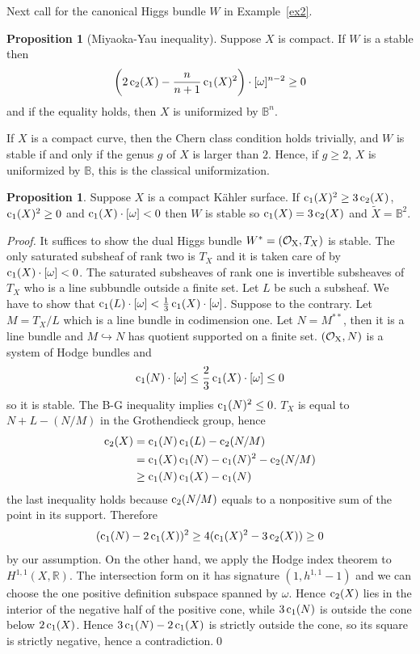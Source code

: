 \documentclass[aspectratio=169, 10pt]{beamer}
\theoremstyle{definition}
\theoremstyle{example}
\newtheorem{proposition}[theorem]{Proposition}
\begin{document}
	\begin{frame}
		Next call for the canonical Higgs bundle $W$ in Example~\ref{ex2}.
		\begin{proposition}[Miyaoka-Yau inequality]\label{prop9.8}
			Suppose $X$ is compact. If $W$ is a stable then \[
			\left(2\operatorname{c}_2(X)-\frac{n}{n+1}\operatorname{c}_1(X)^2\right)\cdot [\omega]^{n-2}\geq 0
			\]
			and if the equality holds, then $X$ is uniformized by $\mathbb{B}^n$.
		\end{proposition}
		If $X$ is a compact curve, then the Chern class condition holds trivially, and $W$ is stable if and only if the genus $g$ of $X$ is larger than $2$. Hence, if $g\geq 2$, $X$ is uniformized by $\mathbb{B}$, this is the classical uniformization.
	\end{frame}
	\begin{frame}[allowframebreaks]
		\begin{proposition}\label{prop9.9}
			Suppose $X$ is a compact K\"ahler surface. If $\operatorname{c}_1(X)^2\geq 3\operatorname{c}_2(X)$, $\operatorname{c}_1(X)^2\geq 0$ and $\operatorname{c}_1(X)\cdot [\omega]<0$ then $W$ is stable so $\operatorname{c}_1(X)=3\operatorname{c}_2(X)$ and $\widetilde{X}=\mathbb{B}^2$.
		\end{proposition}
		\textit{Proof.}
		It suffices to show the dual Higgs bundle $W^*=(\operatorname{\mathcal{O}_X},T_X)$ is stable. The only saturated subsheaf of rank two is $T_X$ and it is taken care of by $\operatorname{c}_1(X)
		\cdot [\omega]<0$. The saturated subsheaves of rank one is invertible subsheaves of $T_X$ who is a line subbundle outside a finite set. Let $L$ be such a subsheaf. We have to show that $\operatorname{c}_1(L)\cdot [\omega]<\frac{1}{3}\operatorname{c}_1(X)\cdot [\omega]$. Suppose to the contrary. Let $M=T_X/L$ which is a line bundle in codimension one. Let $N=M^{**}$, then it is a line bundle and $M\hookrightarrow N$ has quotient supported on a finite set. $(\operatorname{\mathcal{O}_X},N)$ is a system of Hodge bundles and 
		\[
		\operatorname{c}_1(N)\cdot [\omega]\leq \frac{2}{3}\operatorname{c}_1(X)\cdot [\omega]\leq 0
		\]
		so it is stable. The B-G inequality implies $\operatorname{c}_1(N)^2\leq 0$. $T_X$ is equal to $N+L-(N/M)$ in the Grothendieck group, hence 
		\begin{align*}
			\operatorname{c}_2(X)&=\operatorname{c}_1(N)\operatorname{c}_1(L)-\operatorname{c}_2(N/M)\\
			&=\operatorname{c}_1(X)\operatorname{c}_1(N)-\operatorname{c}_1(N)^2-\operatorname{c}_2(N/M)\\
			&\geq \operatorname{c}_1(N)\operatorname{c}_1(X)-\operatorname{c}_1(N)
		\end{align*}
		the last inequality holds because $\operatorname{c}_2(N/M)$ equals to a nonpositive sum of the point in its support. Therefore 
		\[
		(\operatorname{c}_1(N)-2\operatorname{c}_1(X))^2\geq 4(\operatorname{c}_1(X)^2-3
		\operatorname{c}_2(X))\geq 0
		\] 
		by our assumption. On the other hand, we apply the Hodge index theorem to $H^{1,1}(X,\mathbb{R})$. The intersection form on it has signature $(1,h^{1,1}-1)$ and we can choose the one positive definition subspace spanned by $\omega$. Hence $\operatorname{c}_2(X)$ lies in the interior of the negative half of the positive cone, while $3\operatorname{c}_1(N)$ is outside the cone below $2\operatorname{c}_1(X)$. Hence $3\operatorname{c}_1(N)-2\operatorname{c}_1(X)$ is strictly outside the cone, so its square is strictly negative, hence a contradiction.\hfill \qed
	\end{frame}
\end{document}

